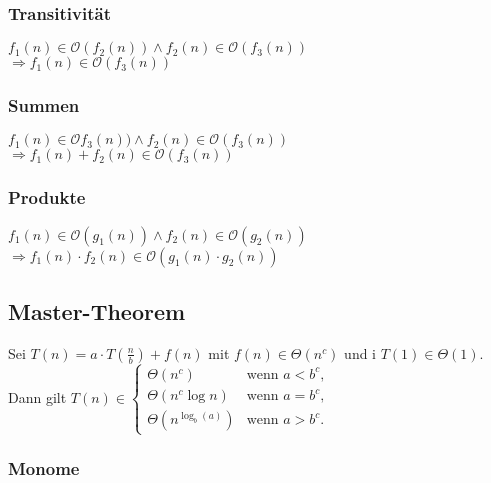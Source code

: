 \documentclass[11pt, a4paper, twoside]{article}
\begin{document}
\begin{multicols}{3}

    \subsubsection*{Transitivität}

    $f_1(n) \in \mathcal{O}(f_2(n)) \wedge f_2(n) \in\mathcal{O}(f_3(n))$ \\
    $\Rightarrow f_1(n) \in \mathcal{O}(f_3(n))$

    \subsubsection*{Summen}

    $f_1(n) \in \mathcal{O}f_3(n)) \wedge f_2(n) \in \mathcal{O}(f_3(n))$ \\
    $\Rightarrow f_1(n) + f_2(n) \in \mathcal{O}(f_3(n))$

    \subsubsection*{Produkte}

    $f_1(n) \in \mathcal{O}(g_1(n)) \wedge f_2(n) \in \mathcal{O}(g_2(n))$ \\
    $\Rightarrow f_1(n) \cdot f_2(n) \in \mathcal{O}(g_1(n) \cdot g_2(n))$


    \columnbreak

    \subsection{Master-Theorem}

    Sei $T(n) = a \cdot T(\frac{n}{b}) + f(n)$ mit $f(n) \in \Theta(n^c)$ und i
    $T(1) \in \Theta(1)$. Dann gilt
    $
    T(n) \in \begin{cases}
        \Theta(n^c) &\text{wenn } a < b^c, \\
        \Theta(n^c \log n) &\text{wenn } a = b^c, \\
        \Theta(n^{\log_b(a)}) &\text{wenn } a > b^c.
    \end{cases}
    $ 

    \subsubsection{Monome}


\end{multicols}
\end{document}
